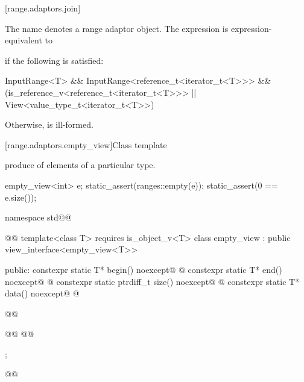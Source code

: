{\begin{itemdescr}
\pnum
\oldtxt{\returns} 
\end{itemdescr}

[range.adaptors.join]{}

\pnum
The name  denotes a range adaptor
object.  The expression
  is
expression-equivalent to 
{\color{oldclr}
if the following is satisfied:
\begin{codeblock}
InputRange<T> &&
InputRange<reference_t<iterator_t<T>>> &&
(is_reference_v<reference_t<iterator_t<T>>> ||
 View<value_type_t<iterator_t<T>>)
\end{codeblock}
Otherwise,  is ill-formed.
} %

[range.adaptors.empty_view]{Class template }

\pnum
{}   produce
  of  elements of
a particular type.

\pnum
\begin{example}
\begin{codeblock}
empty_view<int> e;
static_assert(ranges::empty(e));
static_assert(0 == e.size());
\end{codeblock}
\end{example}

\begin{codeblock}
namespace std@@ { @@
  template<class T>
    requires is_object_v<T>
  class empty_view : public view_interface<empty_view<T>> {
  public:
    constexpr static T* begin() noexcept@\oldtxt{;} @
    constexpr static T* end() noexcept@\oldtxt{;} @
    constexpr static ptrdiff_t size() noexcept@\oldtxt{;} @
    constexpr static T* data() noexcept@\oldtxt{;} @

    @@

    @@
    @@
  };
}@\oldtxt{\}}@
\end{codeblock}

}
